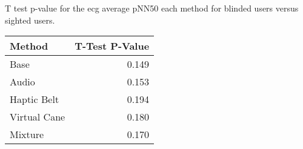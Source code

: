 
\centering
\caption{T test p-value for the ecg average pNN50 each method for blinded users versus sighted users.}
\label{tab:ttest_ecg_pnn50}
\begin{tabular}{lr}
\toprule
      Method &  T-Test P-Value \\
\midrule
        Base &           0.149 \\
       Audio &           0.153 \\
 Haptic Belt &           0.194 \\
Virtual Cane &           0.180 \\
     Mixture &           0.170 \\
\bottomrule
\end{tabular}
